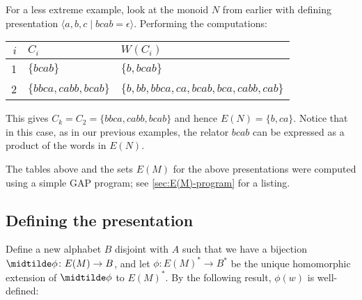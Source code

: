 \documentclass[noindex,noinsetproof,emphthm,12pt]{lmaths}
\begin{document}
\begin{example} \label{ex:monoidN}
	For a less extreme example, look at the monoid $N$ from earlier with defining presentation $\langle a, b, c \mid bcab = \epsilon\rangle$. Performing the computations:

	\begin{center}
	\renewcommand{\arraystretch}{1.2}
	\begin{tabular}{r|ll}
		$i$ & $C_i$ & $W(C_i)$ \\ \hline
		1 & $\{bcab\}$ & $\{b, bcab\}$ \\
		2 & $\{bbca, cabb, bcab\}$ & $\{b, bb, bbca, ca, bcab, bca, cabb, cab\}$
	\end{tabular}
	\end{center}

	This gives $C_k = C_2 = \{bbca, cabb, bcab\}$ and hence $E(N) = \{b, ca\}$. Notice that in this case, as in our previous examples, the relator $bcab$ can be expressed as a product of the words in $E(N)$.

\end{example}

The tables above and the sets $E(M)$ for the above presentations were computed using a simple GAP program; see \cref{sec:E(M)-program} for a listing.


\subsection{Defining the presentation} \label{sec:defining-presentation}

Define a new alphabet $B$ disjoint with $A$ such that we have a bijection $\midtilde\phi \colon E(M) \to B$, and let $\phi \colon E(M)^* \to B^*$ be the unique homomorphic extension of $\midtilde\phi$ to $E(M)^*$. By the following result, $\phi(w)$ is well-defined:
\end{document}
